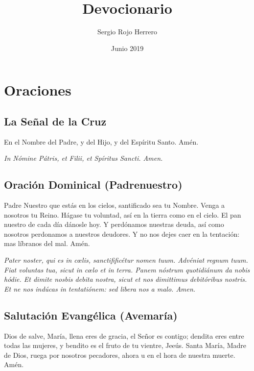 \documentclass[a4paper,11pt, oneside]{report}
\title{Devocionario}
\author{Sergio Rojo Herrero}
\date{Junio 2019}
\begin{document}
  
  \begin{titlepage}
    \maketitle    
  \end{titlepage}

  \tableofcontents{}

  \newpage

  \chapter{Oraciones}

    \section{La Señal de la Cruz}
      En el Nombre del Padre, y del Hijo, y del Espíritu Santo. Amén.

      \medskip

      \textit{In Nómine Pátris, et Filii, et Spíritus Sancti. Amen.}

    \section{Oración Dominical (Padrenuestro)}
      
      Padre Nuestro que estás en los cielos, santificado sea tu Nombre. Venga a nosotros tu Reino. Hágase tu voluntad, así en la tierra como
      en el cielo. El pan nuestro de cada día dánosle hoy. Y perdónamos nuestras deuda, así como nosotros perdonamos a nuestros deudores.
      Y no nos dejes caer en la tentación: mas líbranos del mal. Amén.
      
      \medskip

      \textit{Pater noster, qui es in c{\oe}lis, sanctifificétur nomen tuum. Advéniat regnum tuum. Fiat voluntas tua, sicut in c{\oe}lo et in terra.
      Panem nóstrum quotidiánum da nobis hódie. Et dimite nosbis debita nostra, sicut et nos dimittimus debitóribus nostris. Et ne nos indúcas
      in tentatiónem: sed libera nos a malo. Amen.}

    \section{Salutación Evangélica (Avemaría)}
      Dios de salve, María, llena eres de gracia, el Señor es contigo; dendita eres entre todas las mujeres, y bendito es el fruto de tu
      vientre, Jeeús. Santa María, Madre de Dios, ruega por nosotros pecadores, ahora u en el hora de nuestra muerte. Amén.
      
\end{document}
